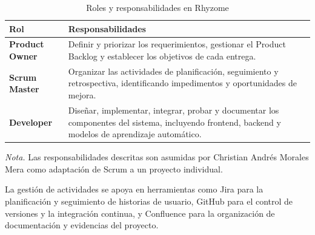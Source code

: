 \begin{table}[htbp]
    \centering

    \caption{Roles y responsabilidades en Rhyzome}
    \label{tab:roles_scrum}

    \renewcommand{\arraystretch}{1.5}

    \begin{tabularx}{\textwidth}{
        |>{\raggedright\arraybackslash}p{3cm}|
         >{\raggedright\arraybackslash}X|
    }
        \hline

        \rowcolor{gray!15}
        \textbf{Rol} &
        \textbf{Responsabilidades} \\

        \hline

        \textbf{Product Owner} & Definir y priorizar los requerimientos, gestionar el Product Backlog y establecer los objetivos de cada entrega. \\

        \hline

        \textbf{Scrum Master} & Organizar las actividades de planificación, seguimiento y retrospectiva, identificando impedimentos y oportunidades de mejora. \\

        \hline

        \textbf{Developer} & Diseñar, implementar, integrar, probar y documentar los componentes del sistema, incluyendo frontend, backend y modelos de aprendizaje automático. \\

        \hline

    \end{tabularx}

    \par\smallskip
    \raggedright

    \textit{Nota.} Las responsabilidades descritas son asumidas por Christian Andrés Morales Mera como adaptación de Scrum a un proyecto individual.

\end{table}


La gestión de actividades se apoya en herramientas como Jira para la planificación y seguimiento de historias de usuario, GitHub para el control de versiones y la integración continua, y Confluence para la organización de documentación y evidencias del proyecto.



